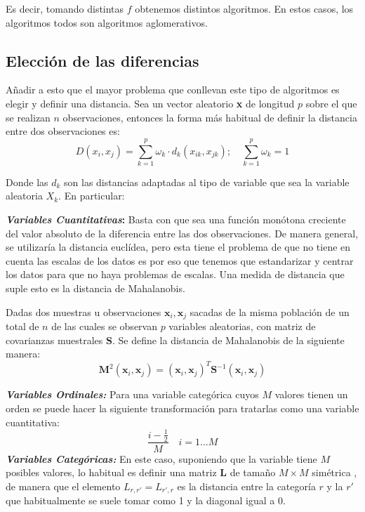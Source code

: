 \noindent Es decir, tomando distintas $f$ obtenemos distintos algoritmos. En estos casos, los algoritmos todos son algoritmos aglomerativos. 

\subsection{Elección de las diferencias }
\noindent Añadir a esto que el mayor problema que conllevan este tipo de algoritmos es elegir y definir una distancia. Sea un vector aleatorio \textbf{x} de longitud $p$ sobre el que se realizan $n$ observaciones, entonces la forma más habitual de definir la distancia entre dos observaciones es:
\begin{equation}
D(x_i,x_j)=\sum_{k=1}^p \omega_k \cdot d_k(x_{ik},x_{jk}); \quad \sum_{k=1}^p \omega_k=1
\end{equation}

\noindent Donde las $d_k$ son las distancias adaptadas al tipo de variable que sea la variable aleatoria $X_k$. En particular:

\noindent \textbf{\textit{Variables Cuantitativas}: }Basta con que sea una función monótona creciente del valor absoluto de la diferencia entre las dos observaciones. De manera general, se utilizaría la distancia euclídea, pero esta tiene el problema de que no tiene en cuenta las escalas de los datos es por eso que tenemos que estandarizar y centrar los datos para que no haya problemas de escalas. Una medida de distancia que suple esto es la distancia de Mahalanobis.
\begin{defi}
Dadas dos muestras u observaciones $\textbf{x}_i,\textbf{x}_j$ sacadas de la misma población de un total de $n$ de las cuales se observan $p$ variables aleatorias, con matriz de covarianzas muestrales $\textbf{S}$. Se define la distancia de Mahalanobis de la siguiente manera: 
\begin{equation}
\textbf{M}^2(\textbf{x}_i,\textbf{x}_j)=(\textbf{x}_i,\textbf{x}_j)^T \textbf{S}^{-1} (\textbf{x}_i,\textbf{x}_j)
\end{equation}
\end{defi}
\noindent \textbf{\textit{Variables Ordinales: }} Para una variable categórica cuyos $M$ valores tienen un orden se puede hacer la siguiente transformación para tratarlas como una variable cuantitativa:
\begin{equation}
\dfrac{i-\frac{1}{2}}{M} \quad i=1\ldots M
\end{equation}
\noindent \textbf{\textit{Variables Categóricas: }}En este caso, suponiendo que la variable tiene $M$ posibles valores, lo habitual es definir una matriz $\textbf{L}$ de tamaño $M\times M$ simétrica , de manera que el elemento $L_{r,r'}=L_{r',r}$ es la distancia entre la categoría $r$ y la $r'$ que habitualmente se suele tomar como 1 y la diagonal igual a 0. 

